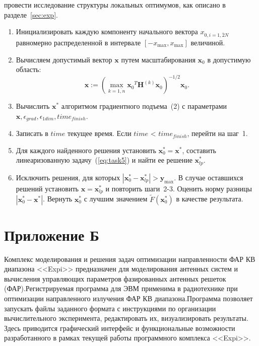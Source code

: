  провести исследование структуры локальных оптимумов, как описано в разделе~\ref{sec:exp}.\\

\begin{enumerate}
  \item Инициализировать каждую компоненту начального вектора $x_{0,i = \overline{1,2N}}$ равномерно распределенной в интервале $[-x_{\max}, x_{\max}]$
  величиной.
  \item Вычисляем допустимый вектор $\textbf{x}$ путем масштабирования $\textbf{x}_0$ в допустимую область:
  $$\textbf{x} := (\max_{k=\overline{1,n}} {\textbf{x}_0}^T \textbf{H}^{(k)}{\textbf{x}_0})^{-1/2} {\textbf{x}_0}.$$
  \item Вычислить ${\textbf{x}^{*}}$ алгоритмом градиентного подъема~(2) с параметрами ${\textbf{x}}, \epsilon_{grad}, \epsilon_{1dim}, time_{finish}.$
  \item Записать в $time$ текущее время. Если $time$ < $time_{finish}$, перейти на шаг~1.
  \item Для каждого найденного решения установить ${\textbf{x}_0^{*}} = {\textbf{x}^{*}}$, составить линеаризованную задачу~(\ref{eq:task5}) и найти
  ее решение ${\textbf{x}_{lp}^{*}}$.
  \item Исключить решения, для которых $|{\textbf{x}_0^{*}} - {\textbf{x}_{lp}^{*}}| > {\textbf{y}_{\max}}$. В случае оставшихся решений установить
  $\textbf{x} = {\textbf{x}_{lp}^{*}}$ и повторить шаги~2-3. Оценить норму разницы $|{\textbf{x}_0^{*}} - {\textbf{x}^{*}}|$. Вернуть ${\textbf{x}_0^{*}}$ с
  лучшим значением $\tilde{F}({\textbf{x}_0^{*}})$ в качестве результата.
\end{enumerate}

\section{Приложение Б}
\label{sec:applic_b}
Комплекс моделирования и решения задач оптимизации направленности ФАР КВ диапазона <<Expi>> предназначен для моделирования антенных систем и вычисления управляющих параметров фазированных антенных решеток (ФАР).Регистрируемая программа для ЭВМ применима в радиотехнике
при оптимизации направленного излучения ФАР КВ диапазона.Программа позволяет запускать файлы заданного формата с инструкциями по организации вычислительного эксперимента, редактировать их, визуализировать результаты.
Здесь приводится графический интерфейс и функциональные возможности разработанного в рамках текущей работы программного комплекса <<Expi>>.

